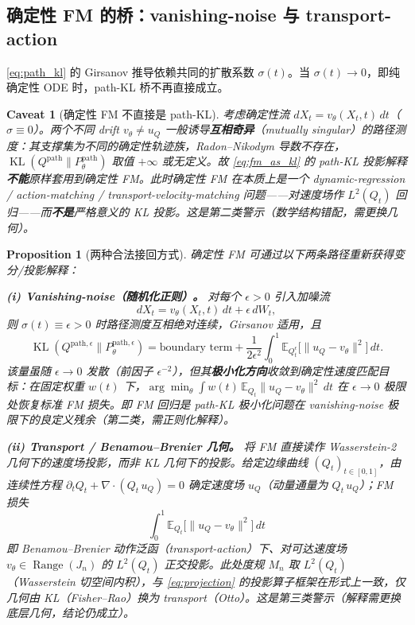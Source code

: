\documentclass[11pt,a4paper]{article}
\newtheorem{proposition}[theorem]{Proposition}
\newtheorem{caveat}[theorem]{Caveat}
\DeclareMathOperator{\KL}{KL}
\newcommand{\E}{\mathbb{E}}
\newcommand{\Range}{\operatorname{Range}}
\begin{document}
\subsection{确定性 FM 的桥：vanishing-noise 与 transport-action}

\eqref{eq:path_kl} 的 Girsanov 推导依赖共同的扩散系数 $\sigma(t)$。当 $\sigma(t)\to 0$，即纯确定性 ODE 时，path-KL 桥不再直接成立。

\begin{caveat}[确定性 FM 不直接是 path-KL]
\label{cav:det_fm}
考虑确定性流 $dX_t = v_\theta(X_t,t)\,dt$（$\sigma\equiv 0$）。两个不同 drift $v_\theta\neq u_Q$ 一般诱导\textbf{互相奇异}（mutually singular）的路径测度：其支撑集为不同的确定性轨迹族，Radon--Nikodym 导数不存在，$\KL(Q^{\text{path}}\|P_\theta^{\text{path}})$ 取值 $+\infty$ 或无定义。故 \eqref{eq:fm_as_kl} 的 path-KL 投影解释\textbf{不能}原样套用到确定性 FM。此时确定性 FM 在本质上是一个 dynamic-regression / action-matching / transport-velocity-matching 问题——对速度场作 $L^2(Q_t)$ 回归——而\textbf{不是}严格意义的 KL 投影。这是第二类警示（数学结构错配，需更换几何）。
\end{caveat}

\begin{proposition}[两种合法接回方式]
\label{prop:det_fm}
确定性 FM 可通过以下两条路径重新获得变分/投影解释：

\textbf{(i) Vanishing-noise（随机化正则）。}\;
对每个 $\epsilon>0$ 引入加噪流
\begin{equation}\label{eq:det_fm_vn}
dX_t = v_\theta(X_t,t)\,dt + \epsilon\,dW_t,
\end{equation}
则 $\sigma(t)\equiv\epsilon>0$ 时路径测度互相绝对连续，Girsanov 适用，且
\[
\KL(Q^{\text{path},\epsilon}\|P_\theta^{\text{path},\epsilon})
= \text{boundary term} + \frac{1}{2\epsilon^2}\int_0^1 \E_{Q_t^\epsilon}\!\bigl[\|u_Q - v_\theta\|^2\bigr]\,dt.
\]
该量虽随 $\epsilon\to0$ 发散（前因子 $\epsilon^{-2}$），但其\textbf{极小化方向}收敛到确定性速度匹配目标：在固定权重 $w(t)$ 下，$\arg\min_\theta \int w(t)\,\E_{Q_t}\|u_Q - v_\theta\|^2\,dt$ 在 $\epsilon\to0$ 极限处恢复标准 FM 损失。即 FM 回归是 path-KL 极小化问题在 vanishing-noise 极限下的良定义残余（第二类，需正则化解释）。

\textbf{(ii) Transport / Benamou--Brenier 几何。}\;
将 FM 直接读作 Wasserstein-2 几何下的速度场投影，而非 KL 几何下的投影。给定边缘曲线 $(Q_t)_{t\in[0,1]}$，由连续性方程 $\partial_t Q_t + \nabla\!\cdot(Q_t\,u_Q)=0$ 确定速度场 $u_Q$（动量通量为 $Q_t\,u_Q$）；FM 损失
\[
\int_0^1 \E_{Q_t}\!\bigl[\|u_Q - v_\theta\|^2\bigr]\,dt
\]
即 Benamou--Brenier 动作泛函（transport-action）下、对可达速度场 $v_\theta\in\Range(J_n)$ 的 $L^2(Q_t)$ 正交投影。此处度规 $M_n$ 取 $L^2(Q_t)$（Wasserstein 切空间内积），与 \eqref{eq:projection} 的投影算子框架在形式上一致，仅几何由 KL（Fisher--Rao）换为 transport（Otto）。这是第三类警示（解释需更换底层几何，结论仍成立）。
\end{proposition}
\end{document}
